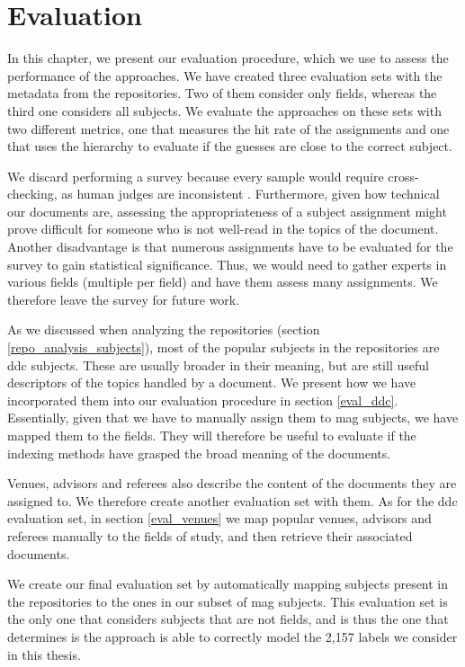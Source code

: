 \section{Evaluation} \label{eval}

In this chapter, we present our evaluation procedure, which we use to assess the performance of the approaches. We have created three evaluation sets with the metadata from the repositories. Two of them consider only fields, whereas the third one considers all subjects. We evaluate the approaches on these sets with two different metrics, one that measures the hit rate of the assignments and one that uses the hierarchy to evaluate if the guesses are close to the correct subject. 

We discard performing a survey because every sample would require cross-checking, as human judges are inconsistent \cite{csomai2007investigations}. Furthermore, given how technical our documents are, assessing the appropriateness of a subject assignment might prove difficult for someone who is not well-read in the topics of the document. Another disadvantage is that numerous assignments have to be evaluated for the survey to gain statistical significance. Thus, we would need to gather experts in various fields (multiple per field) and have them assess many assignments. We therefore leave the survey for future work.

As we discussed when analyzing the repositories (section \ref{repo_analysis_subjects}), most of the popular subjects in the repositories are \acrfull{ddc} subjects. These are usually broader in their meaning, but are still useful descriptors of the topics handled by a document. We present how we have incorporated them into our evaluation procedure in section \ref{eval_ddc}. Essentially, given that we have to manually assign them to \acrshort{mag} subjects, we have mapped them to the fields. They will therefore be useful to evaluate if the indexing methods have grasped the broad meaning of the documents.

Venues, advisors and referees also describe the content of the documents they are assigned to. We therefore create another evaluation set with them. As for the \acrshort{ddc} evaluation set, in section \ref{eval_venues} we map popular venues, advisors and referees manually to the fields of study, and then retrieve their associated documents.

We create our final evaluation set by automatically mapping subjects present in the repositories to the ones in our subset of \acrshort{mag} subjects. This evaluation set is the only one that considers subjects that are not fields, and is thus the one that determines is the approach is able to correctly model the 2,157 labels we consider in this thesis.

